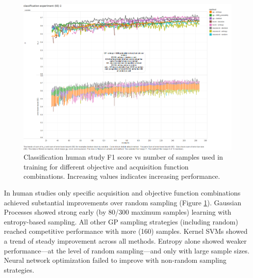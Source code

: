\documentclass{sig-alternate}
\begin{document}
\begin{figure}[tbph]
\centering
\includegraphics[width=\linewidth]{classification_experiment}
\caption{Classification human study F1 score vs number of samples used in training for different objective and acquisition function combinations. Increasing values indicates increasing performance.}
\label{fig:cls_expr}
\end{figure}
In human studies only specific acquisition and objective function combinations achieved substantial improvements over random sampling (Figure \ref{fig:cls_expr}).
%
Gaussian Processes showed strong early (by 80/300 maximum samples) learning with entropy-based sampling.
All other GP sampling strategies (including random) reached competitive performance with more (160) samples.
Kernel SVMs showed a trend of steady improvement across all methods.
Entropy alone showed weaker performance---at the level of random sampling---and only with large sample sizes.
Neural network optimization failed to improve with non-random sampling strategies.
\end{document}
